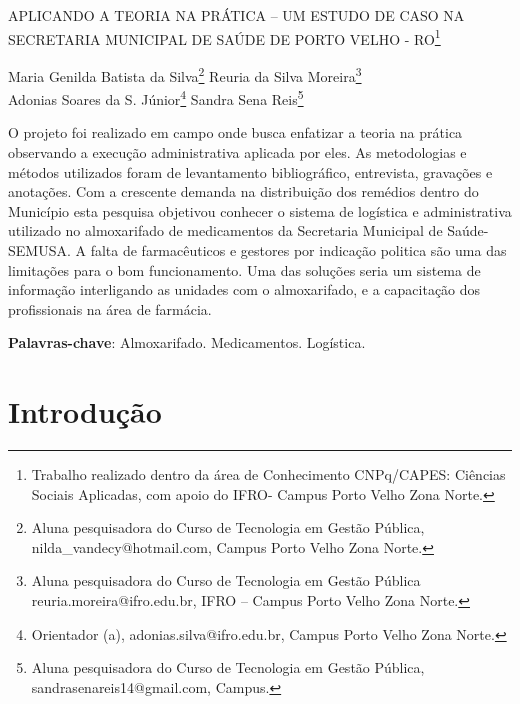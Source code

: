 \documentclass[article,12pt,onesidea,4paper,english,brazil]{abntex2}
\begin{document}
	
	
	\frenchspacing 
	
	\begin{center}
		\LARGE APLICANDO A TEORIA NA PRÁTICA – UM ESTUDO DE CASO NA SECRETARIA MUNICIPAL DE SAÚDE DE PORTO VELHO - RO\footnote{Trabalho realizado dentro da área de Conhecimento CNPq/CAPES: Ciências Sociais Aplicadas, com apoio do IFRO- Campus Porto Velho Zona Norte.}
	
	\normalsize
	Maria Genilda Batista da Silva\footnote{Aluna pesquisadora do Curso de Tecnologia em Gestão Pública, nilda\_vandecy@hotmail.com, Campus Porto Velho Zona Norte.} 
	Reuria da Silva Moreira\footnote{Aluna pesquisadora do Curso de Tecnologia em Gestão Pública reuria.moreira@ifro.edu.br, IFRO – Campus Porto Velho Zona Norte.} \\
	Adonias Soares da S. Júnior\footnote{Orientador (a), adonias.silva@ifro.edu.br, Campus Porto Velho Zona Norte.} 
	Sandra Sena Reis\footnote{Aluna pesquisadora do Curso de Tecnologia em Gestão Pública, sandrasenareis14@gmail.com, Campus.} 
	\end{center}
	
\begin{resumoumacoluna}
	O projeto foi realizado em campo onde busca enfatizar a teoria na prática observando a execução administrativa aplicada por eles. As metodologias e  métodos utilizados foram de levantamento bibliográfico, entrevista, gravações e anotações. Com a crescente demanda na distribuição dos remédios dentro do Município esta pesquisa objetivou conhecer o sistema de logística e administrativa utilizado no almoxarifado de medicamentos da Secretaria Municipal de Saúde- SEMUSA. A falta de farmacêuticos e gestores por indicação politica são uma das limitações para o bom funcionamento. Uma das soluções seria um sistema de informação interligando as unidades com o almoxarifado, e a capacitação dos profissionais na área de farmácia.
	
	\vspace{\onelineskip}
	
	\noindent
	\textbf{Palavras-chave}: Almoxarifado. Medicamentos. Logística.
\end{resumoumacoluna}

\section*{Introdução}
\end{document}
